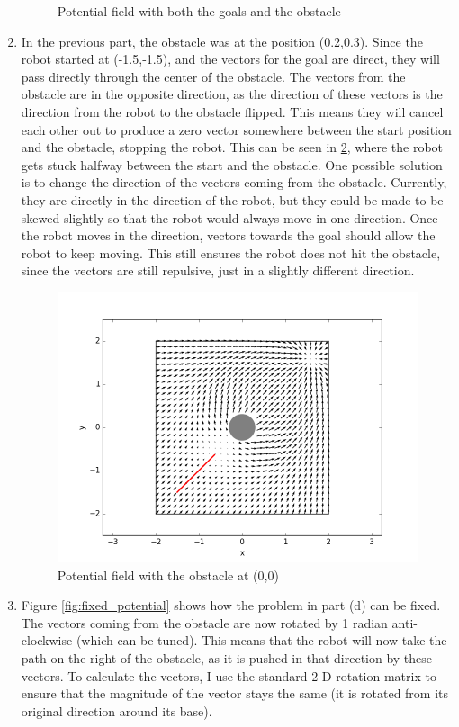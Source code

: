 \documentclass[12pt,a4paper]{article}
\begin{document}
\begin{enumerate}[label=(\alph*)]
\begin{figure}[!h]
		\caption{Potential field with both the goals and the obstacle}
		\label{fig:all_mode}
	\end{figure}
	\item In the previous part, the obstacle was at the position (0.2,0.3). Since the robot started at (-1.5,-1.5), and the vectors for the goal are direct, they will pass directly through the center of the obstacle. The vectors from the obstacle are in the opposite direction, as the direction of these vectors is the direction from the robot to the obstacle flipped. This means they will cancel each other out to produce a zero vector somewhere between the start position and the obstacle, stopping the robot. This can be seen in \ref{fig:failed_potential}, where the robot gets stuck halfway between the start and the obstacle. One possible solution is to change the direction of the vectors coming from the obstacle. Currently, they are directly in the direction of the robot, but they could be made to be skewed slightly so that the robot would always move in one direction. Once the robot moves in the direction, vectors towards the goal should allow the robot to keep moving. This still ensures the robot does not hit the obstacle, since the vectors are still repulsive, just in a slightly different direction.
	\begin{figure}[!h]
		\centering
		\includegraphics[width=\textwidth]{fig/1d.png}
		\caption{Potential field with the obstacle at (0,0)}
		\label{fig:failed_potential}
	\end{figure}
	\item Figure \ref{fig:fixed_potential} shows how the problem in part (d) can be fixed. The vectors coming from the obstacle are now rotated by 1 radian anti-clockwise (which can be tuned). This means that the robot will now take the path on the right of the obstacle, as it is pushed in that direction by these vectors. To calculate the vectors, I use the standard 2-D rotation matrix to ensure that the magnitude of the vector stays the same (it is rotated from its original direction around its base).

\end{enumerate}
\end{document}
